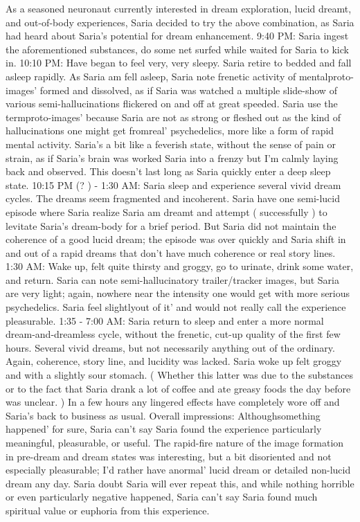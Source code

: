 \documentclass[12pt]{book}
\begin{document}
As a seasoned neuronaut currently interested in dream exploration, lucid dreamt, and out-of-body experiences, Saria decided to try the above combination, as Saria had heard about Saria's potential for dream enhancement. 9:40 PM: Saria ingest the aforementioned substances, do some net surfed while waited for Saria to kick in. 10:10 PM: Have began to feel very, very sleepy. Saria retire to bedded and fall asleep rapidly. As Saria am fell asleep, Saria note frenetic activity of mentalproto-images' formed and dissolved, as if Saria was watched a multiple slide-show of various semi-hallucinations flickered on and off at great speeded. Saria use the termproto-images' because Saria are not as strong or fleshed out as the kind of hallucinations one might get fromreal' psychedelics, more like a form of rapid mental activity. Saria's a bit like a feverish state, without the sense of pain or strain, as if Saria's brain was worked Saria into a frenzy but I'm calmly laying back and observed. This doesn't last long as Saria quickly enter a deep sleep state. 10:15 PM (? ) - 1:30 AM: Saria sleep and experience several vivid dream cycles. The dreams seem fragmented and incoherent. Saria have one semi-lucid episode where Saria realize Saria am dreamt and attempt ( successfully ) to levitate Saria's dream-body for a brief period. But Saria did not maintain the coherence of a good lucid dream; the episode was over quickly and Saria shift in and out of a rapid dreams that don't have much coherence or real story lines. 1:30 AM: Wake up, felt quite thirsty and groggy, go to urinate, drink some water, and return. Saria can note semi-hallucinatory trailer/tracker images, but Saria are very light; again, nowhere near the intensity one would get with more serious psychedelics. Saria feel slightlyout of it' and would not really call the experience pleasurable. 1:35 - 7:00 AM: Saria return to sleep and enter a more normal dream-and-dreamless cycle, without the frenetic, cut-up quality of the first few hours. Several vivid dreams, but not necessarily anything out of the ordinary. Again, coherence, story line, and lucidity was lacked. Saria woke up felt groggy and with a slightly sour stomach. ( Whether this latter was due to the substances or to the fact that Saria drank a lot of coffee and ate greasy foods the day before was unclear. ) In a few hours any lingered effects have completely wore off and Saria's back to business as usual. Overall impressions: Althoughsomething happened' for sure, Saria can't say Saria found the experience particularly meaningful, pleasurable, or useful. The rapid-fire nature of the image formation in pre-dream and dream states was interesting, but a bit disoriented and not especially pleasurable; I'd rather have anormal' lucid dream or detailed non-lucid dream any day. Saria doubt Saria will ever repeat this, and while nothing horrible or even particularly negative happened, Saria can't say Saria found much spiritual value or euphoria from this experience.
\end{document}
